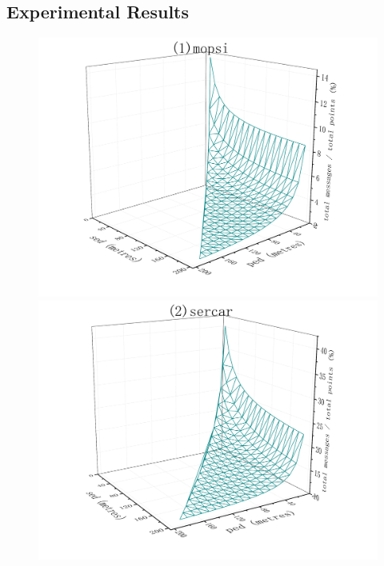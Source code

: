 {\subsection{Experimental Results}


\begin{figure}[tb!]
	\centering
	\includegraphics[scale = 0.210]{figures/Fig-BITT-mopsi-total-messages.png}\hspace{1ex}
	\includegraphics[scale = 0.210]{figures/Fig-BITT-sercar-total-messages.png}\hspace{1ex}

\end{figure}}
